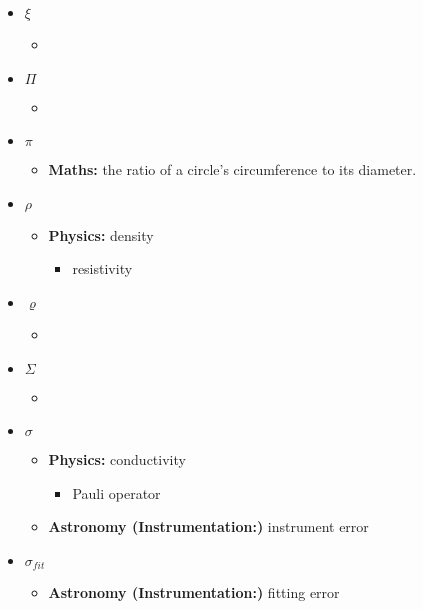 \begin{itemize}
				\item $\xi$
				\begin{itemize}
					\item 
				\end{itemize}
				
				\item $\Pi$
				\begin{itemize}
					\item 
				\end{itemize}
				
				\item $\pi$
				\begin{itemize}
					\item\textbf{Maths:} the ratio of a circle's circumference to its diameter.
				\end{itemize}
				
				\item $\rho$
				\begin{itemize}
					\item \textbf{Physics:} density
					\begin{itemize}
						\item resistivity
					\end{itemize}
				\end{itemize}
				
				\item $\varrho$
				\begin{itemize}
					\item 
				\end{itemize}
				
				\item $\Sigma$
				\begin{itemize}
					\item 
				\end{itemize}
				
				\item $\sigma$
				\begin{itemize}
					\item \textbf{Physics:} conductivity
					\begin{itemize}
						\item Pauli operator
					\end{itemize}
					\item\textbf{Astronomy (Instrumentation:)} instrument error
				\end{itemize}
				
				\item $\sigma_{fit}$
				\begin{itemize}
					\item\textbf{Astronomy (Instrumentation:)} fitting error
				\end{itemize}
				

\end{itemize}
